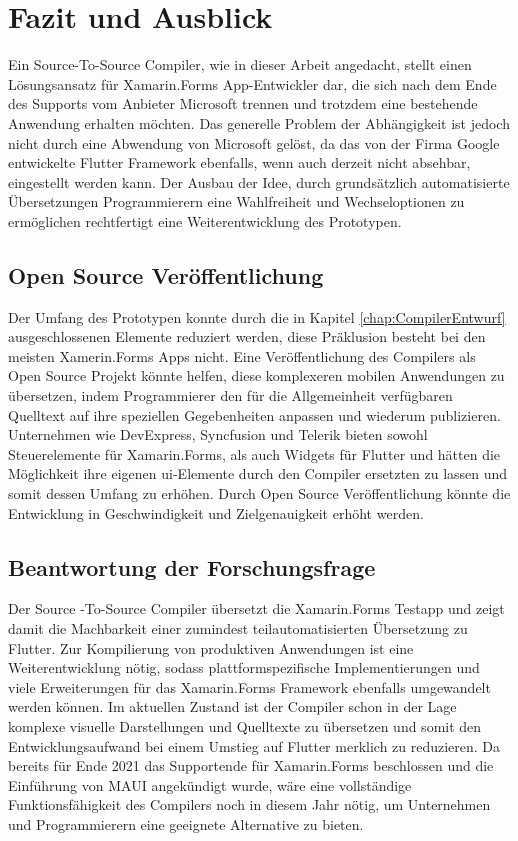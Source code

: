 \chapter{Fazit und Ausblick}
\label{chap:FazitAusblick}
Ein Source-To-Source Compiler,  wie in dieser Arbeit angedacht, stellt einen Lösungsansatz für Xamarin.Forms App-Entwickler dar,  die sich nach dem Ende des Supports vom Anbieter Microsoft trennen und trotzdem eine bestehende Anwendung erhalten möchten.  Das generelle Problem der Abhängigkeit ist jedoch nicht durch eine Abwendung von Microsoft gelöst, da das von der Firma Google entwickelte Flutter Framework ebenfalls, wenn auch derzeit nicht absehbar,  eingestellt werden kann. Der Ausbau der Idee,  durch grundsätzlich automatisierte Übersetzungen Programmierern eine Wahlfreiheit und Wechseloptionen zu ermöglichen rechtfertigt eine Weiterentwicklung des Prototypen.

\section{Open Source Veröffentlichung}

Der Umfang des Prototypen konnte durch die in Kapitel \ref{chap:CompilerEntwurf}  ausgeschlossenen Elemente 
reduziert werden, diese Präklusion besteht bei den meisten Xamerin.Forms Apps nicht. 
Eine Veröffentlichung des Compilers als Open Source Projekt könnte helfen, diese komplexeren 
mobilen Anwendungen zu übersetzen,  indem Programmierer den für die Allgemeinheit verfügbaren 
Quelltext auf ihre speziellen Gegebenheiten anpassen und wiederum publizieren.
Unternehmen wie DevExpress,  Syncfusion und Telerik bieten sowohl Steuerelemente für 
Xamarin.Forms, als auch Widgets für Flutter und hätten die Möglichkeit ihre eigenen \ac{ui}-Elemente 
durch den Compiler ersetzten zu lassen und somit dessen Umfang zu erhöhen.  
Durch Open Source Veröffentlichung könnte die Entwicklung in Geschwindigkeit und Zielgenauigkeit 
erhöht werden.

\section{Beantwortung der Forschungsfrage}
Der Source -To-Source Compiler übersetzt die Xamarin.Forms Testapp und zeigt damit die 
Machbarkeit einer zumindest teilautomatisierten Übersetzung zu Flutter.
Zur Kompilierung von produktiven Anwendungen ist eine Weiterentwicklung nötig, sodass 
plattformspezifische Implementierungen und viele Erweiterungen für das Xamarin.Forms Framework 
ebenfalls umgewandelt werden können.
Im aktuellen Zustand ist der Compiler schon in der Lage komplexe visuelle Darstellungen
und Quelltexte zu übersetzen und somit den Entwicklungsaufwand bei einem Umstieg auf Flutter 
merklich zu reduzieren.
Da bereits für Ende 2021 das Supportende für Xamarin.Forms beschlossen und die Einführung von 
MAUI angekündigt wurde, wäre eine vollständige Funktionsfähigkeit des Compilers noch in diesem 
Jahr nötig, um Unternehmen und Programmierern eine geeignete Alternative zu bieten. 


